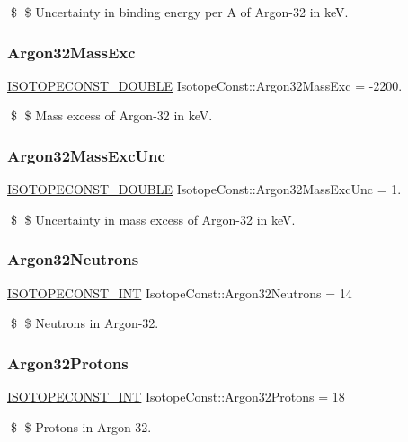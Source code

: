 \$ \$ Uncertainty in binding energy per A of Argon-\/32 in keV. \mbox{\label{group___isotope_const-_argon-_ar32_gad45fc14b589f9925a755d1627fb389dc}} 
\subsubsection{\texorpdfstring{Argon32\+Mass\+Exc}{Argon32MassExc}}
{\footnotesize\ttfamily \mbox{\hyperlink{group___isotope_const-_macros_ga8f45a7272ce02c0b4c65c44636ed719a}{I\+S\+O\+T\+O\+P\+E\+C\+O\+N\+S\+T\+\_\+\+D\+O\+U\+B\+LE}} Isotope\+Const\+::\+Argon32\+Mass\+Exc = -\/2200.}

\$ \$ Mass excess of Argon-\/32 in keV. \mbox{\label{group___isotope_const-_argon-_ar32_ga0cd9b3e0e8aa71925608b137dc77a063}} 
\subsubsection{\texorpdfstring{Argon32\+Mass\+Exc\+Unc}{Argon32MassExcUnc}}
{\footnotesize\ttfamily \mbox{\hyperlink{group___isotope_const-_macros_ga8f45a7272ce02c0b4c65c44636ed719a}{I\+S\+O\+T\+O\+P\+E\+C\+O\+N\+S\+T\+\_\+\+D\+O\+U\+B\+LE}} Isotope\+Const\+::\+Argon32\+Mass\+Exc\+Unc = 1.}

\$ \$ Uncertainty in mass excess of Argon-\/32 in keV. \mbox{\label{group___isotope_const-_argon-_ar32_gafa96fbc3376e61b77faf910d98d8d98a}} 
\subsubsection{\texorpdfstring{Argon32\+Neutrons}{Argon32Neutrons}}
{\footnotesize\ttfamily \mbox{\hyperlink{group___isotope_const-_macros_ga5f18360b3e99483a35c32d789e62621c}{I\+S\+O\+T\+O\+P\+E\+C\+O\+N\+S\+T\+\_\+\+I\+NT}} Isotope\+Const\+::\+Argon32\+Neutrons = 14}

\$ \$ Neutrons in Argon-\/32. \mbox{\label{group___isotope_const-_argon-_ar32_ga5b11e5fa7c393dd7464ace1b8999de84}} 
\subsubsection{\texorpdfstring{Argon32\+Protons}{Argon32Protons}}
{\footnotesize\ttfamily \mbox{\hyperlink{group___isotope_const-_macros_ga5f18360b3e99483a35c32d789e62621c}{I\+S\+O\+T\+O\+P\+E\+C\+O\+N\+S\+T\+\_\+\+I\+NT}} Isotope\+Const\+::\+Argon32\+Protons = 18}

\$ \$ Protons in Argon-\/32. 